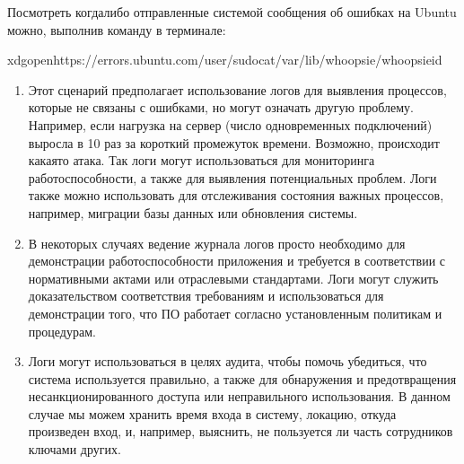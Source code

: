 \documentclass[letterpaper,10pt,russian]{sphinxmanual}
\begin{document}
\sphinxAtStartPar
{}

\sphinxAtStartPar
{}

\sphinxAtStartPar
Посмотреть когда\sphinxhyphen{}либо отправленные системой сообщения об ошибках на Ubuntu можно, выполнив команду в терминале:

\begin{sphinxVerbatim}[commandchars=\\\{\}]
xdg\PYGZhy{}openhttps://errors.ubuntu.com/user/sudocat/var/lib/whoopsie/whoopsie\PYGZhy{}id
\end{sphinxVerbatim}
\begin{enumerate}
%
\setcounter{enumi}{1}
\item {} 
\sphinxAtStartPar
{}
Этот сценарий предполагает использование логов для выявления процессов, которые не связаны с ошибками, но могут означать другую проблему. Например, если нагрузка на сервер (число одновременных подключений) выросла в 10 раз за короткий промежуток времени. Возможно, происходит какая\sphinxhyphen{}то атака. Так логи могут использоваться для мониторинга работоспособности, а также для выявления потенциальных проблем. Логи также можно использовать для отслеживания состояния важных процессов, например, миграции базы данных или обновления системы.

\item {} 
\sphinxAtStartPar
{}
В некоторых случаях ведение журнала логов просто необходимо для демонстрации работоспособности приложения и требуется в соответствии с нормативными актами или отраслевыми стандартами. Логи могут служить доказательством соответствия требованиям и использоваться для демонстрации того, что ПО работает согласно установленным политикам и процедурам.

\item {} 
\sphinxAtStartPar
{}
Логи могут использоваться в целях аудита, чтобы помочь убедиться, что система используется правильно, а также для обнаружения и предотвращения несанкционированного доступа или неправильного использования. В данном случае мы можем хранить время входа в систему, локацию, откуда произведен вход, и, например, выяснить, не пользуется ли часть сотрудников ключами других.

\end{enumerate}
\end{document}
